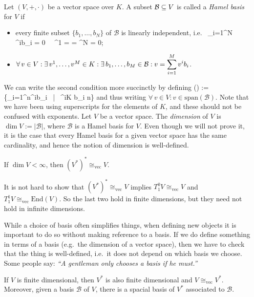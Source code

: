 \bd
Let $(V,+,\cdot)$ be a vector space over $K$. A subset $\mathcal{B}\subseteq V$ is called a \emph{Hamel basis} for $V$ if 
\begin{itemize}
\item every finite subset $\{b_1,\ldots,b_N\}$ of $\mathcal{B}$ is linearly independent, i.e.\
\bse
\sum_{i=1}^N \lambda^ib_i = 0 \ \imp \ \lambda^1 = \cdots = \lambda^N = 0;
\ese
\item $\forall \, v \in V : \exists \, v^1,\ldots,v^M\in K : \exists \, b_1,\ldots,b_M \in \mathcal{B}:v=\displaystyle \sum_{i=1}^Mv^ib_i$.
\end{itemize}
\ed
\br
We can write the second condition more succinctly by defining
\bse
{}() := \bigg\{\sum_{i=1}^n\lambda^ib_i \ \Big| \ \lambda^i\in K \land b_i\in {} \land n\bigg\}
\ese
and thus writing $\forall \, v \in V : v \in \mathrm{span}(\mathcal{B})$.
\er
\br
Note that we have been using superscripts for the elements of $K$, and these should not be confused with exponents.
\er
\bd
Let $V$ be a vector space. The \emph{dimension} of $V$ is $\dim V := |\mathcal{B}|$, where $\mathcal{B}$ is a Hamel basis for $V$.
\ed
Even though we will not prove it, it is the case that every Hamel basis for a given vector space has the same cardinality, and hence the notion of dimension is well-defined.

\begin{theorem}
If $\dim V < \infty$, then $(V^*)^*\cong_\mathrm{vec}V$.
\end{theorem}

\br
It is not hard to show that $(V^*)^*\cong_\mathrm{vec}V$ implies $T^0_1 V \cong_\mathrm{vec} V$ and $T^1_1 V \cong_\mathrm{vec} \mathrm{End}(V)$. So the last two hold in finite dimensions, but they need not hold in infinite dimensions.
\er

\br
While a choice of basis often simplifies things, when defining new objects it is important to do so without making reference to a basis. If we do define something in terms of a basis (e.g.\ the dimension of a vector space), then we have to check that the thing is well-defined, i.e.\ it does not depend on which basis we choose. Some people say: \textit{``A gentleman only chooses a basis if he must.''}
\er

If $V$ is finite dimensional, then $V^*$ is also finite dimensional and $V\cong_\mathrm{vec}V^*$. Moreover, given a basis $\mathcal{B}$ of $V$, there is a spacial basis of $V^*$ associated to $\mathcal{B}$.

